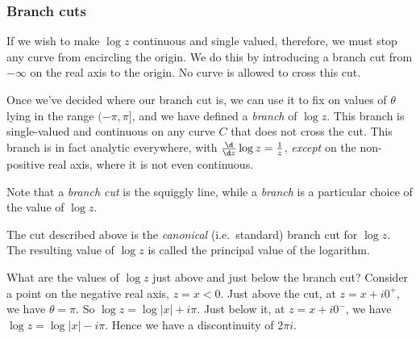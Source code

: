 \documentclass[a4paper]{article}
\begin{document}
\subsubsection*{Branch cuts}
If we wish to make $\log z$ continuous and single valued, therefore, we must stop any curve from encircling the origin. We do this by introducing a branch cut from $-\infty$ on the real axis to the origin. No curve is allowed to cross this cut.
\begin{center}
\end{center}
Once we've decided where our branch cut is, we can use it to fix on values of $\theta$ lying in the range $(-\pi, \pi]$, and we have defined a \emph{branch} of $\log z$. This branch is single-valued and continuous on any curve $C$ that does not cross the cut. This branch is in fact analytic everywhere, with $\frac{\d}{\d z} \log z = \frac{1}{z}$, \emph{except} on the non-positive real axis, where it is not even continuous.

Note that a \emph{branch cut} is the squiggly line, while a \emph{branch} is a particular choice of the value of $\log z$.

The cut described above is the \emph{canonical} (i.e.\ standard) branch cut for $\log z$. The resulting value of $\log z$ is called the principal value of the logarithm.

What are the values of $\log z$ just above and just below the branch cut? Consider a point on the negative real axis, $z = x < 0$. Just above the cut, at $z = x + i 0^+$, we have $\theta = \pi$. So $\log z = \log |x| + i \pi$. Just below it, at $z = x + i0^-$, we have $\log z = \log |x| - i \pi$. Hence we have a discontinuity of $2\pi i$.
\end{document}

